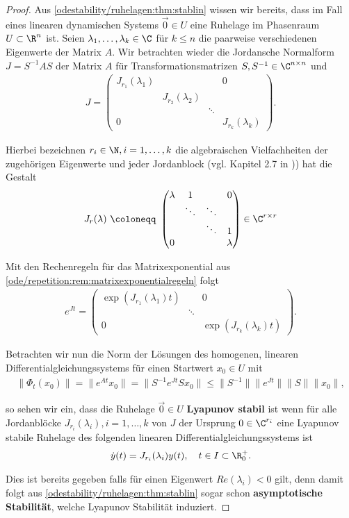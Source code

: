 \documentclass[letterpaper,10pt,english]{jupyterBook}
\begin{document}
\begin{proof}
 Aus \cref{odestability/ruhelagen:thm:stablin} wissen wir bereits, dass im Fall eines linearen dynamischen Systems \(\vec{0} \in U\) eine Ruhelage im Phasenraum \(U \subset \R^n\) ist.
Seien \(\lambda_1, \ldots, \lambda_k \in \C\) für \(k \leq n\) die paarweise verschiedenen Eigenwerte der Matrix \(A\).
Wir betrachten wieder die Jordansche Normalform \(J = S^{-1}AS\) der Matrix \(A\) für Transformationsmatrizen \(S,S^{-1} \in \C^{n \times n}\) und
\begin{align*}
J=
\begin{pmatrix}
J_{r_1}(\lambda_1)& & & 0\\
 & J_{r_2}(\lambda_2) & & \\
 & & \ddots & \\
 0 & & & J_{r_k}(\lambda_k)
\end{pmatrix}.
\end{align*}
\par
Hierbei bezeichnen \(r_i \in \N, i=1,\ldots, k\) die algebraischen Vielfachheiten der zugehörigen Eigenwerte und jeder Jordanblock (vgl. Kapitel 2.7 in \cite{Ten21})) hat die Gestalt
\begin{align*}
 J_r(\lambda) \ \coloneqq \ \begin{pmatrix}
\lambda & 1 & & 0\\
 & \ddots & \ddots & \\
 & & \ddots & 1\\
 0 & & & \lambda
 \end{pmatrix} \in \C^{r\times r}
\end{align*}
\par
Mit den Rechenregeln für das Matrixexponential aus \cref{ode/repetition:rem:matrixexponentialregeln} folgt
\begin{align*}
e^{Jt} = \begin{pmatrix}
\exp{(J_{r_1}(\lambda_1)t)} & & 0\\
 & \ddots & \\
 0& & \exp{(J_{r_k}(\lambda_k)t)}
 \end{pmatrix}.
\end{align*}
\par
Betrachten wir nun die Norm der Lösungen des homogenen, linearen Differentialgleichungssystems für einen Startwert \(x_0 \in U\) mit
\begin{align*}
\| \Phi_t(x_0) \| = \|e^{At}x_0\| = \|S^{-1}e^{Jt}S x_0\| \leq \|S^{-1}\| \|e^{Jt}\| \|S\| \|x_0\|,
\end{align*}
\par
so sehen wir ein, dass die Ruhelage \(\vec{0} \in U\) \textbf{Lyapunov stabil} ist wenn für alle Jordanblöcke \(J_{r_i}(\lambda_i), i=1,\ldots,k\) von \(J\) der Ursprung \(0\in \C^{r_i}\) eine Lyapunov stabile Ruhelage des folgenden linearen Differentialgleichungssystems ist
\begin{align*}
 \dot{y}(t) = J_{r_i}(\lambda_i) y(t), \quad t \in I \subset \R^+_0.
\end{align*}
\par
Dies ist bereits gegeben falls für einen Eigenwert \(Re(\lambda_i)<0\) gilt, denn damit folgt aus \cref{odestability/ruhelagen:thm:stablin} sogar schon \textbf{asymptotische Stabilität}, welche Lyapunov Stabilität induziert.


\end{proof}
\end{document}
